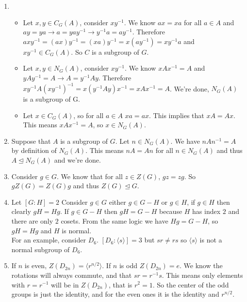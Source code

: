 \documentclass[12pt]{report}
\begin{document}
\begin{enumerate}
  \item \begin{itemize}
        \item Let $x,y \in C_G(A)$, consider $xy^{-1}$. We know $ax = xa$ for
              all $a \in A$ and $ay = ya \to a = yay^{-1} \to y^{-1}a =
              ay^{-1}$. Therefore $axy^{-1}= (ax)y^{-1} = (xa)y^{-1} =
              x(ay^{-1}) = xy^{-1}a$ and $xy^{-1} \in C_G(A)$. So $C$ is a
              subgroup of $G$.

        \item Let $x,y \in N_G(A)$, consider $xy^{-1}$. We know $xAx^{-1} = A$
              and $yAy^{-1} = A \to A = y^{-1}Ay$. Therefore $xy^{-1}A(xy^{-1})
              ^{-1}=x(y^{-1}Ay)x^{-1} = xAx^{-1} = A$. We're done, $N_G(A)$ is a
              subgroup of G.

        \item Let $x \in C_G(A)$, so for all $a \in A$ $xa = ax$. This implies
        that $xA = Ax$. This means $xAx^{-1} = A$, so $x \in N_G(A)$.
        \end{itemize}

  \item Suppose that $A$ is a subgroup of $G$. Let $n \in N_G(A)$. We have
        $nAn^{-1} = A$ by definition of $N_G(A)$. This means $nA = An$ for all
        $n \in N_G(A)$ and thus $A \trianglelefteq N_G(A)$ and we're done.

  \item Consider $g \in G$. We know that for all $z \in Z(G)$, $gz = zg$. So
        $gZ(G) = Z(G)g$ and thus $Z(G) \trianglelefteq G$.

  \item Let $[G:H] = 2$ Consider $g \in G$ either $g \in G-H$ or $g \in H$, if
        $g \in H$ then clearly $gH = Hg$. If $g \in G-H$ then $gH = G-H$ because
        $H$ has index $2$ and there are only $2$ cosets. From the same logic we
        have $Hg = G-H$, so $gH = Hg$ and $H$ is normal.\\

        For an example, consider $D_6$. $[D_6:\langle s \rangle] = 3$ but $sr
        \neq rs$ so $\langle s \rangle$ is not a normal subgroup of $D_6$.

  \item If $n$ is even, $Z(D_{2n}) = \langle r^{n/2} \rangle$. If $n$ is odd
        $Z(D_{2n}) = e$. We know the rotations will always commute, and that
        $sr = r^{-1}s$. This means only elements with $r = r^{-1}$ will be in
        $Z(D_{2n})$, that is $r^2 = 1$. So the center of the odd groups is just
        the identity, and for the even ones it is the identity and $r^{n/2}$.


\end{enumerate}
\end{document}
